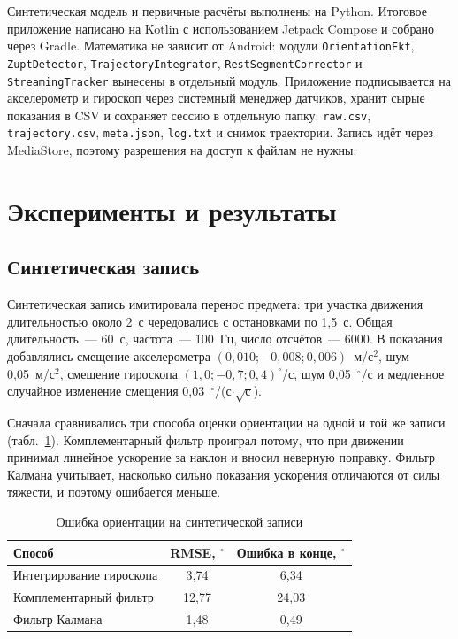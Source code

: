 \documentclass{misisarticle}
\begin{document}
Синтетическая модель и первичные расчёты выполнены на Python. Итоговое приложение написано на Kotlin с использованием Jetpack Compose и собрано через Gradle. Математика не зависит от Android: модули \texttt{OrientationEkf}, \texttt{ZuptDetector}, \texttt{TrajectoryIntegrator}, \texttt{RestSegmentCorrector} и \texttt{StreamingTracker} вынесены в отдельный модуль. Приложение подписывается на акселерометр и гироскоп через системный менеджер датчиков, хранит сырые показания в CSV и сохраняет сессию в отдельную папку: \texttt{raw.csv}, \texttt{trajectory.csv}, \texttt{meta.json}, \texttt{log.txt} и снимок траектории. Запись идёт через MediaStore, поэтому разрешения на доступ к файлам не нужны.

\section{Эксперименты и результаты}

\subsection{Синтетическая запись}

Синтетическая запись имитировала перенос предмета: три участка движения длительностью около 2~с чередовались с остановками по 1,5~с. Общая длительность~--- 60~с, частота~--- 100~Гц, число отсчётов~--- 6000. В показания добавлялись смещение акселерометра $(0{,}010;-0{,}008;0{,}006)$~м/с$^2$, шум 0,05~м/с$^2$, смещение гироскопа $(1{,}0;-0{,}7;0{,}4)^\circ$/с, шум 0,05~$^\circ$/с и медленное случайное изменение смещения 0,03~$^\circ$/(с$\cdot\sqrt{\text{с}}$).

Сначала сравнивались три способа оценки ориентации на одной и той же записи (табл.~\ref{tab:orient}). Комплементарный фильтр проиграл потому, что при движении принимал линейное ускорение за наклон и вносил неверную поправку. Фильтр Калмана учитывает, насколько сильно показания ускорения отличаются от силы тяжести, и поэтому ошибается меньше.

\begin{table}[H]
  \caption{Ошибка ориентации на синтетической записи}
  \label{tab:orient}
  \centering
  \footnotesize
  \begin{tabular}{lcc}
    \toprule
    Способ & RMSE, $^\circ$ & Ошибка в конце, $^\circ$ \\
    \midrule
    Интегрирование гироскопа & 3,74 & 6,34 \\
    Комплементарный фильтр & 12,77 & 24,03 \\
    Фильтр Калмана & 1,48 & 0,49 \\
    \bottomrule
  \end{tabular}
\end{table}
\end{document}
